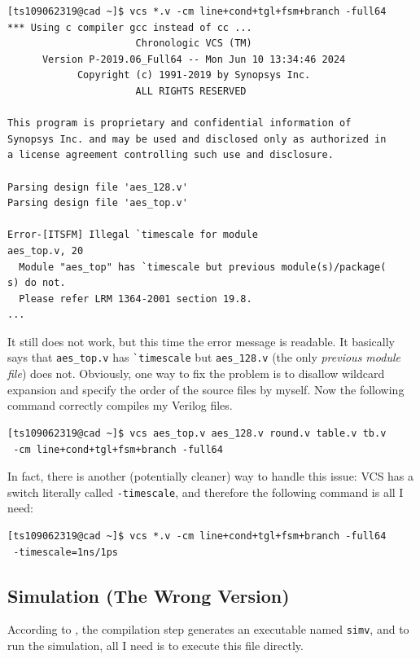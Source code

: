 \documentclass{article}
\begin{document}
\begin{verbatim}
[ts109062319@cad ~]$ vcs *.v -cm line+cond+tgl+fsm+branch -full64
*** Using c compiler gcc instead of cc ...
                      Chronologic VCS (TM)
      Version P-2019.06_Full64 -- Mon Jun 10 13:34:46 2024
            Copyright (c) 1991-2019 by Synopsys Inc.
                      ALL RIGHTS RESERVED

This program is proprietary and confidential information of
Synopsys Inc. and may be used and disclosed only as authorized in
a license agreement controlling such use and disclosure.

Parsing design file 'aes_128.v'
Parsing design file 'aes_top.v'

Error-[ITSFM] Illegal `timescale for module
aes_top.v, 20
  Module "aes_top" has `timescale but previous module(s)/package(
s) do not.
  Please refer LRM 1364-2001 section 19.8.
...
\end{verbatim}

It still does not work, but this time the error message is readable. It basically says that \verb|aes_top.v| has \verb|`timescale| but \verb|aes_128.v| (the only \textit{previous module file}) does not. Obviously, one way to fix the problem is to disallow wildcard expansion and specify the order of the source files by myself. Now the following command correctly compiles my Verilog files.

\begin{verbatim}
[ts109062319@cad ~]$ vcs aes_top.v aes_128.v round.v table.v tb.v
 -cm line+cond+tgl+fsm+branch -full64
\end{verbatim}

In fact, there is another (potentially cleaner) way to handle this issue: VCS has a switch literally called \verb|-timescale|, and therefore the following command is all I need:

\begin{verbatim}
[ts109062319@cad ~]$ vcs *.v -cm line+cond+tgl+fsm+branch -full64
 -timescale=1ns/1ps
\end{verbatim}

\subsection{Simulation (The Wrong Version)}

According to \cite{ytverdiprep}, the compilation step generates an executable named \verb|simv|, and to run the simulation, all I need is to execute this file directly.
\end{document}
